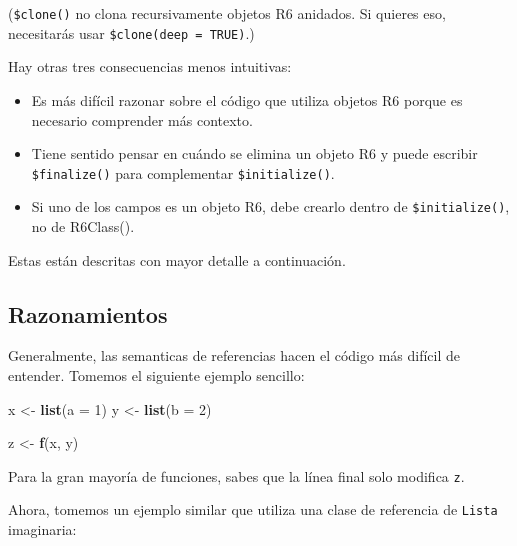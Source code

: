 \documentclass[
]{book}
\newenvironment{Shaded}{\begin{snugshade}}{\end{snugshade}}
\newcommand{\AttributeTok}[1]{\textcolor[rgb]{0.13,0.29,0.53}{#1}}
\newcommand{\DecValTok}[1]{\textcolor[rgb]{0.00,0.00,0.81}{#1}}
\newcommand{\FunctionTok}[1]{\textcolor[rgb]{0.13,0.29,0.53}{\textbf{#1}}}
\newcommand{\NormalTok}[1]{#1}
\newcommand{\OtherTok}[1]{\textcolor[rgb]{0.56,0.35,0.01}{#1}}
\newcommand{\SpecialCharTok}[1]{\textcolor[rgb]{0.81,0.36,0.00}{\textbf{#1}}}
\begin{document}
(\texttt{\$clone()} no clona recursivamente objetos R6 anidados. Si quieres eso, necesitarás usar \texttt{\$clone(deep\ =\ TRUE)}.)

Hay otras tres consecuencias menos intuitivas:

\begin{itemize}
\item
  Es más difícil razonar sobre el código que utiliza objetos R6 porque es necesario comprender más contexto.
\item
  Tiene sentido pensar en cuándo se elimina un objeto R6 y puede escribir \texttt{\$finalize()} para complementar \texttt{\$initialize()}.
\item
  Si uno de los campos es un objeto R6, debe crearlo dentro de \texttt{\$initialize()}, no de R6Class().
\end{itemize}

Estas están descritas con mayor detalle a continuación.

\hypertarget{razonamientos}{%
\subsection{Razonamientos}\label{razonamientos}}

Generalmente, las semanticas de referencias hacen el código más difícil de entender. Tomemos el siguiente ejemplo sencillo:

\begin{Shaded}
\begin{Highlighting}[]
\NormalTok{x }\OtherTok{\textless{}{-}} \FunctionTok{list}\NormalTok{(}\AttributeTok{a =} \DecValTok{1}\NormalTok{)}
\NormalTok{y }\OtherTok{\textless{}{-}} \FunctionTok{list}\NormalTok{(}\AttributeTok{b =} \DecValTok{2}\NormalTok{)}

\NormalTok{z }\OtherTok{\textless{}{-}} \FunctionTok{f}\NormalTok{(x, y)}
\end{Highlighting}
\end{Shaded}

Para la gran mayoría de funciones, sabes que la línea final solo modifica \texttt{z}.

Ahora, tomemos un ejemplo similar que utiliza una clase de referencia de \texttt{Lista} imaginaria:

\begin{Shaded}
\end{Shaded}
\end{document}
